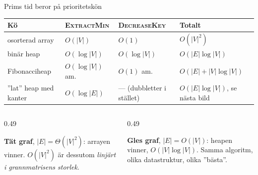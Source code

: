 {\kaninbg
\begin{frame}{\kh Prims tid beror på prioritetskön}
\centering
\small
\begin{tabular}{@{}llll@{}}
\toprule
Kö & \textsc{ExtractMin} & \textsc{DecreaseKey} & Totalt\\
\midrule
osorterad array & $O(|V|)$ & $O(1)$ & $O(|V|^2)$\\
binär heap & $O(\log|V|)$ & $O(\log|V|)$ & $O(|E|\log|V|)$\\
Fibonacciheap & $O(\log|V|)$ am. & $O(1)$ am. & $O(|E|+|V|\log|V|)$\\
”lat” heap med kanter & $O(\log|E|)$ & — (dubbletter i stället) & $O(|E|\log|V|)$, se nästa bild\\
\bottomrule
\end{tabular}
\vfill
\begin{columns}[T]
\begin{column}{0.49\textwidth}
\begin{kaninbox}[fontupper=\footnotesize]
\textbf{Tät graf}, $|E|=\Theta(|V|^2)$: arrayen vinner. $O(|V|^2)$ är dessutom
\emph{linjärt i grannmatrisens storlek}.
\end{kaninbox}
\end{column}
\begin{column}{0.49\textwidth}
\begin{kaninbox}[fontupper=\footnotesize]
\textbf{Gles graf}, $|E|=O(|V|)$: heapen vinner, $O(|V|\log|V|)$.
Samma algoritm, olika datastruktur, olika ”bästa”.
\end{kaninbox}
\end{column}
\end{columns}
\end{frame}}

